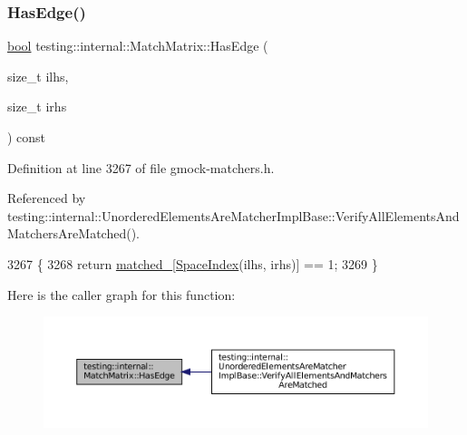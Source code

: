 \subsubsection{\texorpdfstring{Has\+Edge()}{HasEdge()}}
{\footnotesize\ttfamily \hyperlink{classbool}{bool} testing\+::internal\+::\+Match\+Matrix\+::\+Has\+Edge (\begin{DoxyParamCaption}\item[{size\+\_\+t}]{ilhs,  }\item[{size\+\_\+t}]{irhs }\end{DoxyParamCaption}) const\hspace{0.3cm}{\ttfamily [inline]}}



Definition at line 3267 of file gmock-\/matchers.\+h.



Referenced by testing\+::internal\+::\+Unordered\+Elements\+Are\+Matcher\+Impl\+Base\+::\+Verify\+All\+Elements\+And\+Matchers\+Are\+Matched().


\begin{DoxyCode}
3267                                                \{
3268     \textcolor{keywordflow}{return} \hyperlink{classtesting_1_1internal_1_1MatchMatrix_ae01ec0d94b7812559acfcf84f10707e2}{matched\_}[\hyperlink{classtesting_1_1internal_1_1MatchMatrix_aa5c4d081304a4923df078bd153c735e4}{SpaceIndex}(ilhs, irhs)] == 1;
3269   \}
\end{DoxyCode}
Here is the caller graph for this function\+:
\nopagebreak
\begin{figure}[H]
\begin{center}
\leavevmode
\includegraphics[width=350pt]{classtesting_1_1internal_1_1MatchMatrix_a94c7641a932739734cb2207b1bca4036_icgraph}
\end{center}
\end{figure}
\mbox{\label{classtesting_1_1internal_1_1MatchMatrix_a337d9793c61d985dbc1be166e34eed61}} 
